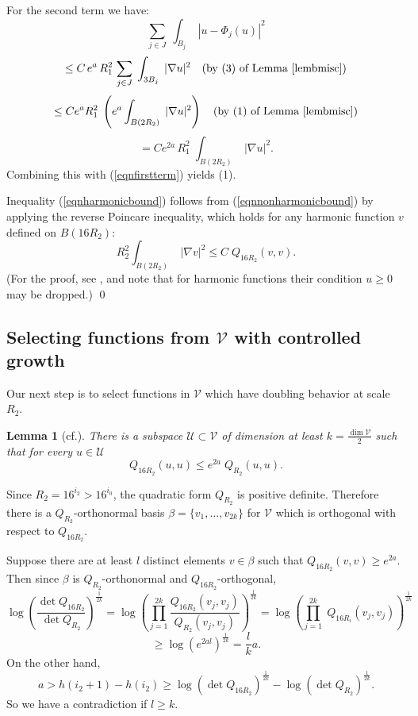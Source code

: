\documentclass[12pt]{amsart}
\numberwithin{equation}{section}
\theoremstyle{plain}
\newtheorem{lemma}[equation]{Lemma}
\theoremstyle{remark}
\theoremstyle{definition}
\newcommand{\U}{{\mathcal U}}
\newcommand{\V}{{\mathcal V}}
\def\be{\beta}
\begin{document}
For the second term we have:
$$
\sum_{j\in J}\;\int_{B_j}\;|u-\Phi_j(u)|^2
$$
$$
\leq C\,e^a\,R_1^2\,\sum_{j\in J}\;
\int_{3B_j}\;|\nabla u|^2
\quad\mbox{(by (3) of Lemma \ref{lembmisc})}
$$
$$
\leq Ce^aR_1^2\;\left(e^a
\int_{B(2R_2)}\;|\nabla u|^2\right)
\quad\mbox{(by (1) of Lemma \ref{lembmisc})}
$$
$$
=Ce^{2a}\,R_1^2\;
\int_{B(2R_2)}\;|\nabla u|^2.
$$
 Combining this with 
(\ref{eqnfirstterm}) yields (1).

\bigskip
Inequality (\ref{eqnharmonicbound}) follows from 
(\ref{eqnnonharmonicbound}) by applying the
reverse Poincare inequality, which holds for any
harmonic function $v$ defined on $B(16R_2)$:
$$
R_2^2\int_{B(2R_2)}\;|\nabla v|^2
\leq C\;Q_{16R_2}(v,v).
$$
(For the proof, see \cite[Lemma 6.3]{schoenyau}, and note 
that for harmonic
functions their condition $u\geq 0$ may be dropped.)
\qed



\bigskip
\bigskip

\subsection{Selecting functions from $\V$ with controlled
growth}
Our next step is to select functions in $\V$ which have doubling
behavior at scale $R_2$.  

\begin{lemma}[cf.]
\label{lemselectu}
There is a subspace $\U\subset\V$ of dimension at
least $k=\frac{\dim\V}{2}$ such that for every $u\in \U$
\begin{equation}
\label{eqnR2controls16R2}
Q_{16R_2}(u,u)\leq e^{2a}\;Q_{R_2}(u,u).
\end{equation}

\end{lemma}
\proof
Since $R_2=16^{i_2}>16^{i_0}$, the quadratic form $Q_{R_2}$
is positive definite.  Therefore there is a $Q_{R_2}$-orthonormal
basis $\be=\{v_1,\ldots,v_{2k}\}$ for $\V$ which is orthogonal
with respect to $Q_{16R_2}$.   

Suppose there are at least $l$ distinct elements $v\in\be$ such that 
 $Q_{16R_2}(v,v)\geq e^{2a}$.  Then since $\be$ is
$Q_{R_2}$-orthonormal and $Q_{16R_2}$-orthogonal,
$$
\log\left(\frac{\det Q_{16R_2}}{\det Q_{R_2}}\right)^\frac{1}{2k}
=\log\left(\prod_{j=1}^{2k}\frac{Q_{16R_2}(v_j,v_j)}{Q_{R_2}(v_j,v_j)}
\right)^{\frac{1}{2k}}
=\log\left(\prod_{j=1}^{2k}\;Q_{16R_i}(v_j,v_j)\right)^{\frac{1}{2k}}
$$
$$
\geq \log\left(e^{2al}\right)^{\frac{1}{2k}}=\frac{l}{k}a.
$$
On the other hand,
$$
a> h(i_2+1)-h(i_2)\geq \log\left(\det Q_{16R_2}\right)^{\frac{1}{2k}}
-\log\left(\det Q_{R_2}\right)^{\frac{1}{2k}}.
$$
So we have a contradiction if $l\geq k$.  
\end{document}
